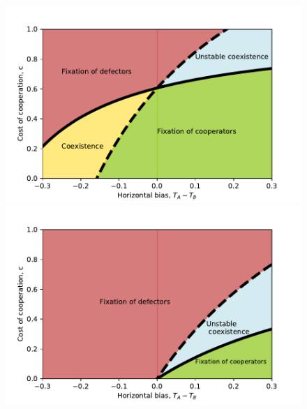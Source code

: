 \documentclass[12pt]{extarticle}
\begin{document}
{\begin{figure}[htb]
  \centering
    \includegraphics[scale=0.75]{boundiries_non_zero_alpha.pdf}
    
    \includegraphics[scale=0.75]{boundiries_alpha0.pdf}
    

\end{figure}}
\end{document}
